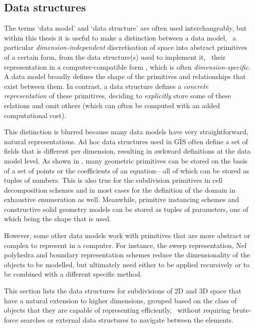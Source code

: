 \subsection{Data structures}
\label{ss:data-structures}

The terms `data model' and `data structure' are often used interchangeably, but within this thesis it is useful to make a distinction between a data model, \ie\ a particular \emph{dimension-independent} discretisation of space into abstract primitives of a certain form, from the data structure(s) used to implement it, \ie\ their representation in a computer-compatible form \citep{Frank92}, which is often \emph{dimension-specific}.
A data model broadly defines the shape of the primitives and relationships that exist between them.
In contrast, a data structure defines a \emph{concrete representation} of these primitives, deciding to \emph{explicitly} store some of these relations and omit others (which can often be computed with an added computational cost).

This distinction is blurred because many data models have very straightforward, natural representations.
Ad hoc data structures used in GIS often define a set of fields that is different per dimension, resulting in awkward definitions at the data model level.
As shown in , many geometric primitives can be stored on the basis of a set of points or the coefficients of an equation---all of which can be stored as tuples of numbers.
This is also true for the subdivision primitives in cell decomposition schemes and in most cases for the definition of the domain in exhaustive enumeration as well.
Meanwhile, primitive instancing schemes and constructive solid geometry models can be stored as tuples of parameters, one of which being the shape that is used.

However, some other data models work with primitives that are more abstract or complex to represent in a computer.
For instance, the sweep representation, Nef polyhedra and boundary representation schemes reduce the dimensionality of the objects to be modelled, but ultimately need either to be applied recursively or to be combined with a different specific method.

This section lists the data structures for subdivisions of 2D and 3D space that have a natural extension to higher dimensions, grouped based on the class of objects that they are capable of representing efficiently,
\ie\ without requiring brute-force searches or external data structures to navigate between the elements.

